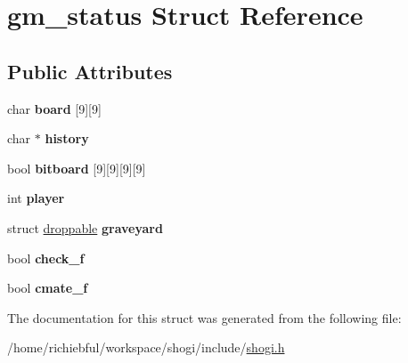 \hypertarget{structgm__status}{\section{gm\-\_\-status Struct Reference}
\label{structgm__status}
}
\subsection*{Public Attributes}
\begin{DoxyCompactItemize}
\item 
\hypertarget{structgm__status_af0a849fb64f778c61400ed4f369566e4}{char {\bfseries board} \mbox{[}9\mbox{]}\mbox{[}9\mbox{]}}\label{structgm__status_af0a849fb64f778c61400ed4f369566e4}

\item 
\hypertarget{structgm__status_a799bee6ba5ab4157509ecacea3a3a571}{char $\ast$ {\bfseries history}}\label{structgm__status_a799bee6ba5ab4157509ecacea3a3a571}

\item 
\hypertarget{structgm__status_afc59e40a92eba404b147c492adba9292}{bool {\bfseries bitboard} \mbox{[}9\mbox{]}\mbox{[}9\mbox{]}\mbox{[}9\mbox{]}\mbox{[}9\mbox{]}}\label{structgm__status_afc59e40a92eba404b147c492adba9292}

\item 
\hypertarget{structgm__status_acbe5d21acfd8ac8473a47cd68cea42fb}{int {\bfseries player}}\label{structgm__status_acbe5d21acfd8ac8473a47cd68cea42fb}

\item 
\hypertarget{structgm__status_a5648b45e2db91a89576b8d3bd9dd4541}{struct \hyperlink{structdroppable}{droppable} {\bfseries graveyard}}\label{structgm__status_a5648b45e2db91a89576b8d3bd9dd4541}

\item 
\hypertarget{structgm__status_a96b9027aae59e467d56f5a2e2b2b0dbc}{bool {\bfseries check\-\_\-f}}\label{structgm__status_a96b9027aae59e467d56f5a2e2b2b0dbc}

\item 
\hypertarget{structgm__status_a822e01e122d6aa4beee449488d72b460}{bool {\bfseries cmate\-\_\-f}}\label{structgm__status_a822e01e122d6aa4beee449488d72b460}

\end{DoxyCompactItemize}


The documentation for this struct was generated from the following file\-:\begin{DoxyCompactItemize}
\item 
/home/richiebful/workspace/shogi/include/\hyperlink{shogi_8h}{shogi.\-h}\end{DoxyCompactItemize}
